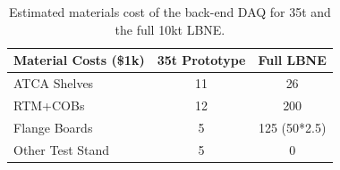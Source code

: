 \begin{table}[tbh]
\begin{center}
\begin{tabular}{|l|c|c|}   
\hline \hline 
Material Costs (\$1k)  & 35t  Prototype  &Full LBNE \\      
\hline
   ATCA Shelves          & 11&26 \\ 
   RTM+COBs              & 12& 200\\ 
   Flange Boards          &5& 125 (50*2.5)\\ 
   Other Test Stand                   &5     &  0 \\ 
\hline \hline
\end{tabular}
\caption[]{Estimated materials cost of the back-end DAQ for 35t and the full 10kt LBNE.}
\label{tab:mats} 
\end{center}
\end{table}

